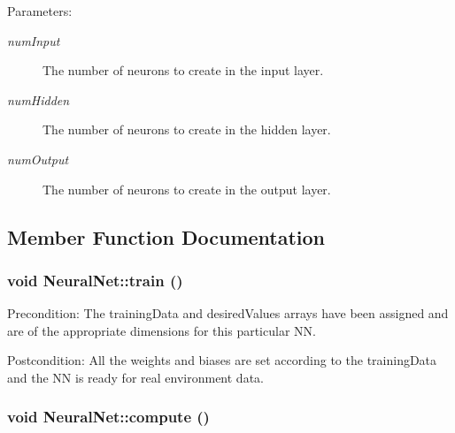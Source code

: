 \begin{Desc}
\item[Parameters:]
\begin{description}
\item[{\em numInput}]The number of neurons to create in the input layer. \item[{\em numHidden}]The number of neurons to create in the hidden layer. \item[{\em numOutput}]The number of neurons to create in the output layer. \end{description}
\end{Desc}


\subsection{Member Function Documentation}
\hypertarget{classNeuralNet_ae2e3914f799ae37da4f3d088e5259db}{
\subsubsection{\setlength{\rightskip}{0pt plus 5cm}void NeuralNet::train ()}}
\label{classNeuralNet_ae2e3914f799ae37da4f3d088e5259db}


\begin{Desc}
\item[Precondition:]The trainingData and desiredValues arrays have been assigned and are of the appropriate dimensions for this particular NN. \end{Desc}
\begin{Desc}
\item[Postcondition:]All the weights and biases are set according to the trainingData and the NN is ready for real environment data. \end{Desc}
\hypertarget{classNeuralNet_3ae443739e4e6a6c0d86d5149bde706f}{
\subsubsection{\setlength{\rightskip}{0pt plus 5cm}void NeuralNet::compute ()}}
\label{classNeuralNet_3ae443739e4e6a6c0d86d5149bde706f}


